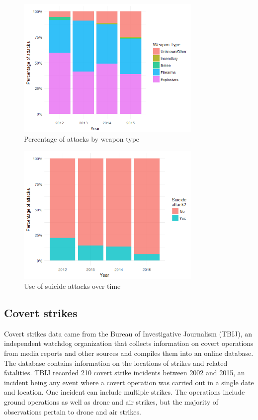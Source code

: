 \documentclass[letterpaper,12pt]{article}
\theoremstyle{definition}
\begin{document}
\begin{figure}[htb!]
\begin{center}
\caption {Percentage of attacks by weapon type}
  \includegraphics[width=3.5in]{attack_weapon.png}
\end{center}
\end{figure}

\begin{figure}[htb!]
\begin{center}
\caption {Use of suicide attacks over time}
  \includegraphics[width=3.5in]{attack_suicide.png}
\end{center}
\end{figure}

\newpage
\subsection{Covert strikes}

Covert strikes data came from the Bureau of Investigative Journalism (TBIJ), an independent watchdog organization that collects information on covert operations from media reports and other sources and compiles them into an online database. The database contains information on the locations of strikes and related fatalities. TBIJ recorded 210 covert strike incidents between 2002 and 2015, an incident being any event where a covert operation was carried out in a single date and location. One incident can include multiple strikes. The operations include ground operations as well as drone and air strikes, but the majority of observations pertain to drone and air strikes. 
\end{document}
